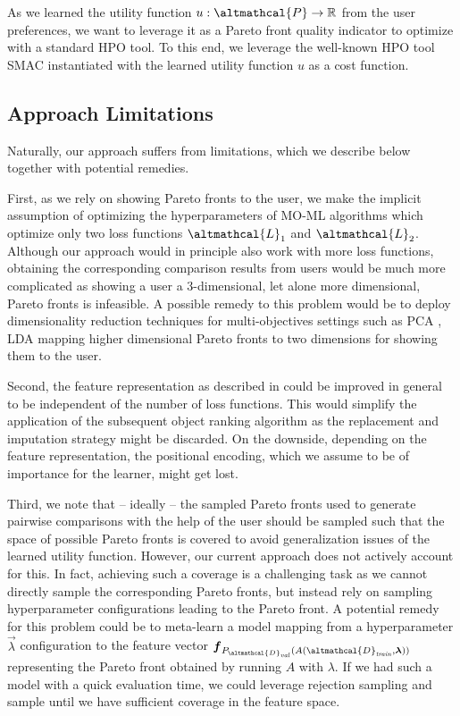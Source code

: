 As we learned the utility function $u: \altmathcal{P} \rightarrow \mathbb{R}$ from the user preferences, we want to leverage it as a Pareto front quality indicator to optimize with a standard HPO tool. To this end, we leverage the well-known HPO tool SMAC \cite{hutter-lion11a,lindauer-jmlr22a} instantiated with the learned utility function $u$ as a cost function. 


\subsection{Approach Limitations}

Naturally, our approach suffers from limitations, which we describe below together with potential remedies.

First, as we rely on showing Pareto fronts to the user, we make the implicit assumption of optimizing the hyperparameters of MO-ML algorithms which optimize only two loss functions $\altmathcal{L}_1$ and $\altmathcal{L}_2$. Although our approach would in principle also work with more loss functions, obtaining the corresponding comparison results from users would be much more complicated as showing a user a $3$-dimensional, let alone more dimensional, Pareto fronts is infeasible. A possible remedy to this problem would be to deploy dimensionality reduction techniques for multi-objectives settings \cite{deb-kangal05} such as PCA \cite{jolliffe-ftrc16}, LDA \cite{balakrishnama-article98} mapping higher dimensional Pareto fronts to two dimensions for showing them to the user.

Second, the feature representation as described in  could be improved in general to be independent of the number of loss functions. This would simplify the application of the subsequent object ranking algorithm as the replacement and imputation strategy might be discarded. On the downside, depending on the feature representation, the positional encoding, which we assume to be of importance for the learner, might get lost.

Third, 
we note that -- ideally -- the sampled Pareto fronts used to generate pairwise comparisons with the help of the user should be sampled such that the space of possible Pareto fronts is covered to avoid generalization issues of the learned utility function. However, our current approach does not actively account for this. In fact, achieving such a coverage is a challenging task as we cannot directly sample the corresponding Pareto fronts, but instead rely on sampling hyperparameter configurations leading to the Pareto front. A potential remedy for this problem could be to meta-learn a model mapping from a hyperparameter $\vec{\lambda}$ configuration to the feature vector $\vec{f}_{P_{\altmathcal{D}_{\mathit{val}}}(A(\altmathcal{D}_\mathit{train}, \vec{\lambda}))}$ representing the Pareto front obtained by running $A$ with $\lambda$. If we had such a model with a quick evaluation time, we could leverage rejection sampling and sample until we have sufficient coverage in the feature space.

